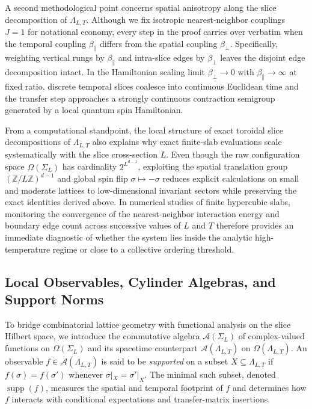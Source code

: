 \documentclass[11pt]{article}
\theoremstyle{definition}
\begin{document}
A second methodological point concerns spatial anisotropy along the slice
decomposition of $\Lambda_{L,T}$. Although we fix isotropic nearest-neighbor
couplings $J = 1$ for notational economy, every step in the proof carries over
verbatim when the temporal coupling $\beta_\parallel$ differs from the spatial
coupling $\beta_\perp$. Specifically, weighting vertical rungs by $\beta_\parallel$
and intra-slice edges by $\beta_\perp$ leaves the disjoint edge decomposition
intact. In the Hamiltonian scaling limit $\beta_\perp \to 0$ with $\beta_\parallel
\to \infty$ at fixed ratio, discrete temporal slices coalesce into continuous
Euclidean time and the transfer step approaches a strongly continuous contraction
semigroup generated by a local quantum spin Hamiltonian.

From a computational standpoint, the local structure of exact toroidal slice
decompositions of $\Lambda_{L,T}$ also explains why exact finite-slab evaluations
scale systematically with the slice cross-section $L$. Even though the raw
configuration space $\Omega(\Sigma_L)$ has cardinality $2^{L^{d-1}}$, exploiting the
spatial translation group $(\mathbb{Z}/L\mathbb{Z})^{d-1}$ and global spin flip
$\sigma \mapsto -\sigma$ reduces explicit calculations on small and moderate
lattices to low-dimensional invariant sectors while preserving the exact identities
derived above. In numerical studies of finite hypercubic slabs, monitoring the
convergence of the nearest-neighbor interaction energy and boundary edge count
across successive values of $L$ and $T$ therefore provides an immediate diagnostic
of whether the system lies inside the analytic high-temperature regime or close to a
collective ordering threshold.

\subsection{Local Observables, Cylinder Algebras, and Support Norms}
\label{subsec:s01b}

To bridge combinatorial lattice geometry with functional analysis on the slice
Hilbert space, we introduce the commutative algebra $\mathcal{A}(\Sigma_L)$ of
complex-valued functions on $\Omega(\Sigma_L)$ and its spacetime counterpart
$\mathcal{A}(\Lambda_{L,T})$ on $\Omega(\Lambda_{L,T})$. An observable $f \in
\mathcal{A}(\Lambda_{L,T})$ is said to be \emph{supported} on a subset $X \subseteq
\Lambda_{L,T}$ if $f(\sigma) = f(\sigma')$ whenever $\sigma|_X = \sigma'|_X$. The
minimal such subset, denoted $\operatorname{supp}(f)$, measures the spatial and
temporal footprint of $f$ and determines how $f$ interacts with conditional
expectations and transfer-matrix insertions.
\end{document}
